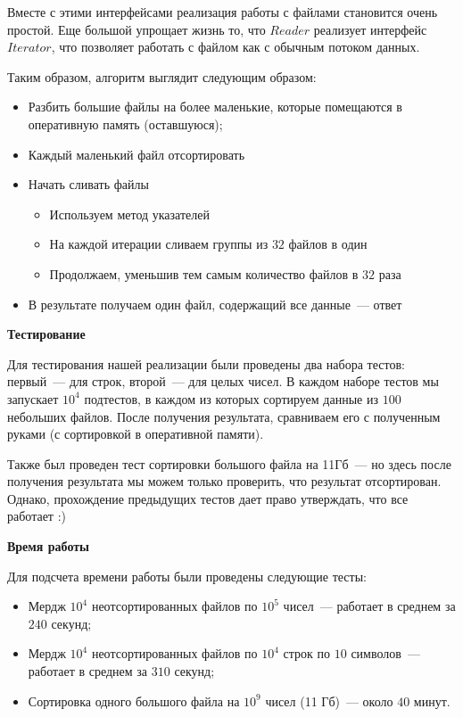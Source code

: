 \documentclass[11pt,a4paper,oneside]{article}
\begin{document}
Вместе с этими интерфейсами реализация работы с файлами становится очень простой. Еще большой упрощает жизнь то, что $Reader$ реализует интерфейс $Iterator$, что позволяет работать с файлом как с обычным потоком данных.

Таким образом, алгоритм выглядит следующим образом:

\begin{itemize}
\item Разбить большие файлы на более маленькие, которые помещаются в оперативную память (оставшуюся);
\item Каждый маленький файл отсортировать
\item Начать сливать файлы
    \begin{itemize}
    \item Используем метод указателей
    \item На каждой итерации сливаем группы из $32$ файлов в один
    \item Продолжаем, уменьшив тем самым количество файлов в $32$ раза
    \end{itemize}
\item В результате получаем один файл, содержащий все данные~--- ответ
\end{itemize}

\textbf{Тестирование}

Для тестирования нашей реализации были проведены два набора тестов: первый~--- для строк, второй~--- для целых чисел. В каждом наборе тестов мы запускает $10^4$ подтестов, в каждом из которых сортируем данные из $100$ небольших файлов. После получения результата, сравниваем его с полученным руками (с сортировкой в оперативной памяти).

Также был проведен тест сортировки большого файла на 11Гб~--- но здесь после получения результата мы можем только проверить, что результат отсортирован. Однако, прохождение предыдущих тестов дает право утверждать, что все работает :)

\textbf{Время работы}

Для подсчета времени работы были проведены следующие тесты: 

\begin{itemize}
\item Мердж $10^4$ неотсортированных файлов по $10^5$ чисел~--- работает в среднем за $240$ секунд;
\item Мердж $10^4$ неотсортированных файлов по $10^4$ строк по $10$ символов~--- работает в среднем за $310$ секунд;
\item Сортировка одного большого файла на $10^9$ чисел (11 Гб)~--- около $40$ минут.
\end{itemize}
\end{document}
